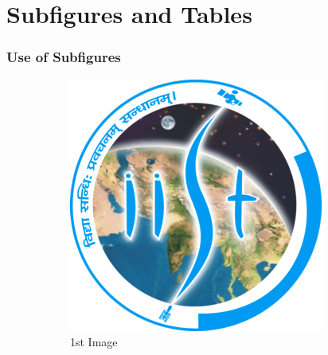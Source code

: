 \documentclass[aspectratio=169]{beamer}
\begin{document}
\section{Subfigures and Tables}
\begin{frame}
  \frametitle{Use of Subfigures}
  \begin{figure}
    \centering
    \begin{subfigure}[b]{0.35\textwidth}
      \centering
      \includegraphics[width=\textwidth]{figures/Indian_Institute_of_Space_Science_and_Technology_Logo.png}
      \caption{1st Image}
      \label{fig:img1}
    \end{subfigure}
    \hspace{0.3cm}
    \begin{subfigure}[b]{0.35\textwidth}
      \centering

\end{subfigure}
\end{figure}
\end{frame}
\end{document}
